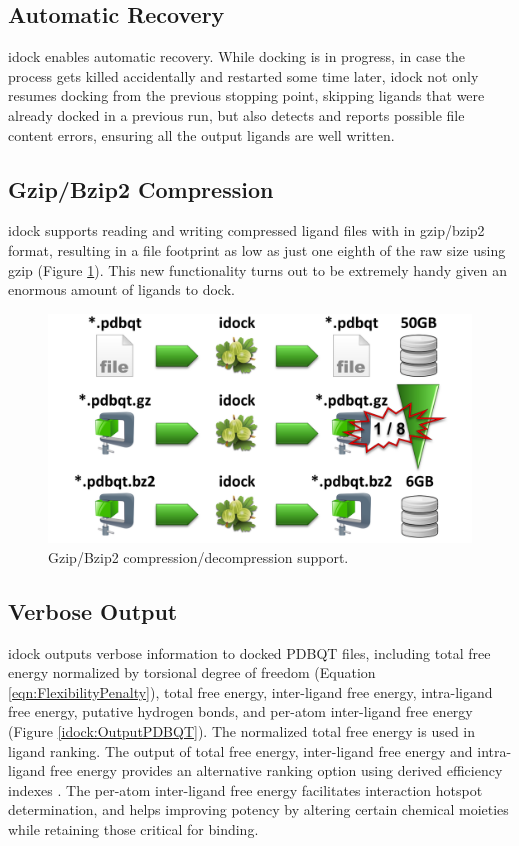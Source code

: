 \subsection{Automatic Recovery}

idock enables automatic recovery. While docking is in progress, in case the process gets killed accidentally and restarted some time later, idock not only resumes docking from the previous stopping point, skipping ligands that were already docked in a previous run, but also detects and reports possible file content errors, ensuring all the output ligands are well written.

\subsection{Gzip/Bzip2 Compression}

idock supports reading and writing compressed ligand files with in gzip/bzip2 format, resulting in a file footprint as low as just one eighth of the raw size using gzip (Figure \ref{idock:Compression}). This new functionality turns out to be extremely handy given an enormous amount of ligands to dock.

\begin{figure}
\centering
\includegraphics[width=\linewidth]{idock/Compression.png}
\caption{Gzip/Bzip2 compression/decompression support.}
\label{idock:Compression}
\end{figure}

\subsection{Verbose Output}

idock outputs verbose information to docked PDBQT files, including total free energy normalized by torsional degree of freedom (Equation \eqref{eqn:FlexibilityPenalty}), total free energy, inter-ligand free energy, intra-ligand free energy, putative hydrogen bonds, and per-atom inter-ligand free energy (Figure \ref{idock:OutputPDBQT}). The normalized total free energy is used in ligand ranking. The output of total free energy, inter-ligand free energy and intra-ligand free energy provides an alternative ranking option using derived efficiency indexes \citep{335,336,337}. The per-atom inter-ligand free energy facilitates interaction hotspot determination, and helps improving potency by altering certain chemical moieties while retaining those critical for binding.

